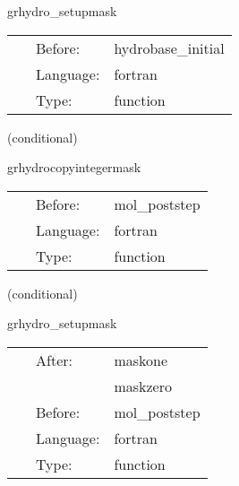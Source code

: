 \hspace{5mm} grhydro\_setupmask 

\hspace{5mm}{\it initialize the atmosphere mask } 


\hspace{5mm}

 \begin{tabular*}{160mm}{cll} 
~ & Before:  & hydrobase\_initial \\ 
~ & Language:  & fortran \\ 
~ & Type:  & function \\ 
\end{tabular*} 


\vspace{5mm}

   (conditional) 

\hspace{5mm} grhydrocopyintegermask 

\hspace{5mm}{\it initialize the real valued atmosphere mask after checkpoint recovery } 


\hspace{5mm}

 \begin{tabular*}{160mm}{cll} 
~ & Before:  & mol\_poststep \\ 
~ & Language:  & fortran \\ 
~ & Type:  & function \\ 
\end{tabular*} 


\vspace{5mm}

   (conditional) 

\hspace{5mm} grhydro\_setupmask 

\hspace{5mm}{\it initialize the atmosphere mask } 


\hspace{5mm}

 \begin{tabular*}{160mm}{cll} 
~ & After:  & maskone \\ 
~& ~ &maskzero\\ 
~ & Before:  & mol\_poststep \\ 
~ & Language:  & fortran \\ 
~ & Type:  & function \\ 
\end{tabular*} 


